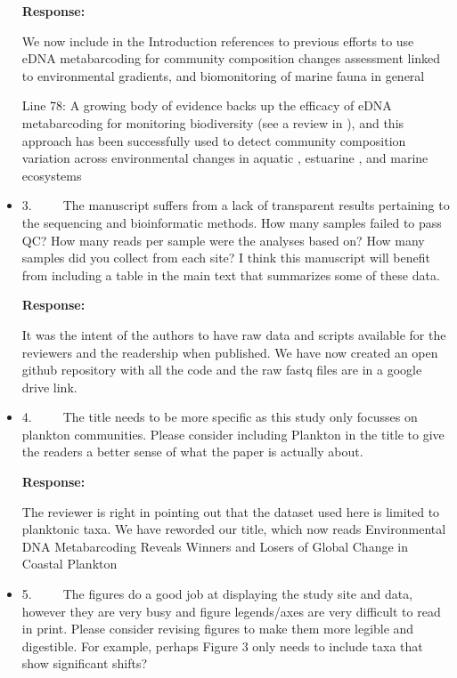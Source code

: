\documentclass[11pt]{article}
\begin{document}
\begin{linenumbers}
\begin{itemize}
\textbf{Response:}

We now include in the Introduction references to previous efforts to use eDNA metabarcoding for community composition changes assessment linked to environmental gradients, and biomonitoring of marine fauna in general

Line 78: {\color{red}A growing body of evidence backs up the efficacy of eDNA metabarcoding for monitoring biodiversity (see a review in \cite{ruppert2019past}), and this approach has been successfully used to detect community composition variation across environmental changes in aquatic  \cite{emilson2017dna}, estuarine \cite{chariton2015metabarcoding, lallias2015environmental}, and marine ecosystems \cite{berry2019marine}}



\item{3.      The manuscript suffers from a lack of transparent results pertaining to the sequencing and bioinformatic methods. How many samples failed to pass QC? How many reads per sample were the analyses based on? How many samples did you collect from each site? I think this manuscript will benefit from including a table in the main text that summarizes some of these data.}

\textbf{Response:}

It was the intent of the authors to have raw data and scripts available for the reviewers and the readership when published. We have now created an open github repository with all the code and the raw fastq files are in a google drive link.

\item{4.      The title needs to be more specific as this study only focusses on plankton communities. Please consider including Plankton in the title to give the readers a better sense of what the paper is actually about.}

\textbf{Response:}

The reviewer is right in pointing out that the dataset used here is limited to  planktonic taxa. We have reworded our title, which now reads {\color{red} Environmental DNA Metabarcoding Reveals Winners and Losers of Global Change in Coastal Plankton} 


\item{5.      The figures do a good job at displaying the study site and data, however they are very busy and figure legends/axes are very difficult to read in print. Please consider revising figures to make them more legible and digestible. For example, perhaps Figure 3 only needs to include taxa that show significant shifts? }


\end{itemize}
\end{linenumbers}
\end{document}
